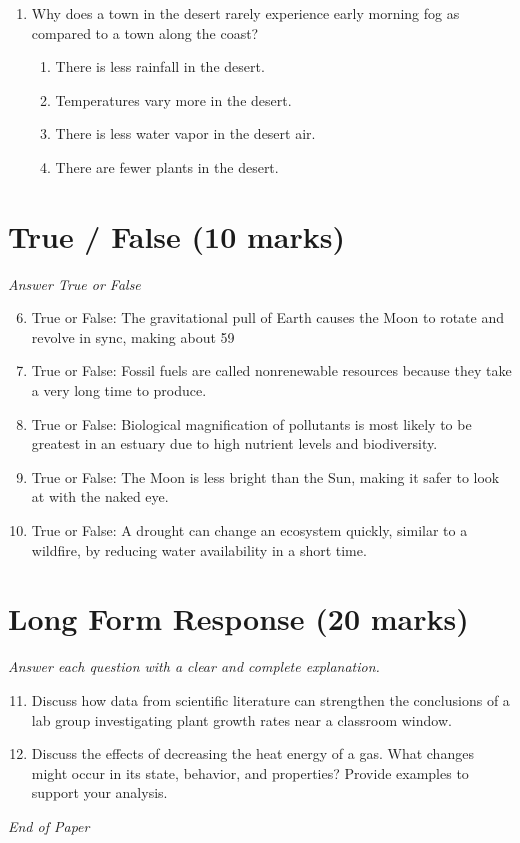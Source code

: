 \documentclass[12pt]{article}
\begin{document}
\begin{enumerate}[label=\arabic*.]
\begin{enumerate}[label=(\alph*)]
    \item an increase in precipitation
    \item a decrease in pollutants
\end{enumerate}
\item Why does a town in the desert rarely experience early morning fog as compared to a town along the coast?
\begin{enumerate}[label=(\alph*)]
    \item There is less rainfall in the desert.
    \item Temperatures vary more in the desert.
    \item There is less water vapor in the desert air.
    \item There are fewer plants in the desert.
\end{enumerate}
\end{enumerate}

\section*{True / False (10 marks)}
\textit{Answer True or False}
\begin{enumerate}[label=\arabic*.]
\setcounter{enumi}{5}
\item True or False: The gravitational pull of Earth causes the Moon to rotate and revolve in sync, making about 59\\%
\item True or False: Fossil fuels are called nonrenewable resources because they take a very long time to produce.
\item True or False: Biological magnification of pollutants is most likely to be greatest in an estuary due to high nutrient levels and biodiversity.
\item True or False: The Moon is less bright than the Sun, making it safer to look at with the naked eye.
\item True or False: A drought can change an ecosystem quickly, similar to a wildfire, by reducing water availability in a short time.
\end{enumerate}

\section*{Long Form Response (20 marks)}
\textit{Answer each question with a clear and complete explanation.}
\begin{enumerate}[label=\arabic*.]
\setcounter{enumi}{10}
\item Discuss how data from scientific literature can strengthen the conclusions of a lab group investigating plant growth rates near a classroom window.
\item Discuss the effects of decreasing the heat energy of a gas. What changes might occur in its state, behavior, and properties? Provide examples to support your analysis.
\end{enumerate}

\vfill
\noindent\textit{End of Paper}
\end{document}
